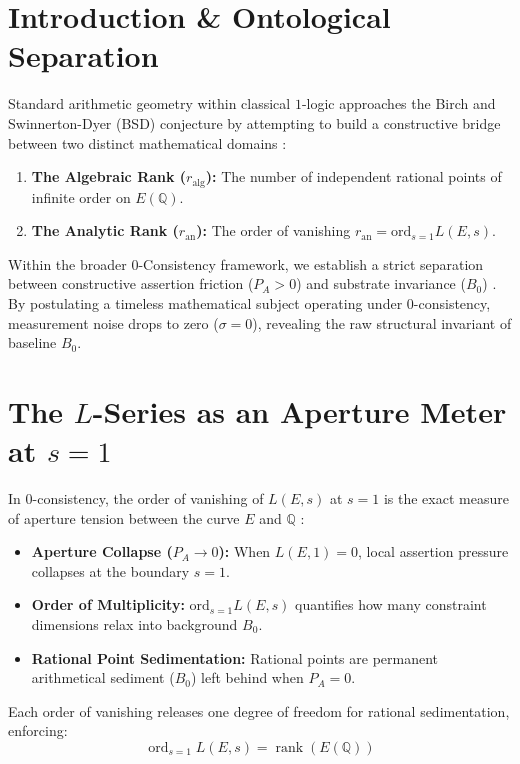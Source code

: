 \documentclass[11pt,a4paper]{article}
\begin{document}
\section{Introduction \& Ontological Separation}
Standard arithmetic geometry within classical $1$-logic approaches the Birch and Swinnerton-Dyer (BSD) conjecture \cite{birch_swinnerton_dyer_1965} by attempting to build a constructive bridge between two distinct mathematical domains \cite{nicht_theory_monograph}:
\begin{enumerate}
    \item \textbf{The Algebraic Rank ($r_{\text{alg}}$):} The number of independent rational points of infinite order on $E(\mathbb{Q})$.
    \item \textbf{The Analytic Rank ($r_{\text{an}}$):} The order of vanishing $r_{\text{an}} = \text{ord}_{s=1} L(E, s)$.
\end{enumerate}

Within the broader $0$-Consistency framework, we establish a strict separation between constructive assertion friction ($P_A > 0$) and substrate invariance ($B_0$) \cite{nicht_metaphysics_paper_0}. By postulating a timeless mathematical subject operating under $0$-consistency, measurement noise drops to zero ($\sigma = 0$), revealing the raw structural invariant of baseline $B_0$.

\section{The \texorpdfstring{$L$}{L}-Series as an Aperture Meter at \texorpdfstring{$s=1$}{s=1}}
In $0$-consistency, the order of vanishing of $L(E, s)$ at $s=1$ is the exact measure of aperture tension between the curve $E$ and $\mathbb{Q}$ \cite{nicht_theory_monograph}:

\begin{itemize}
    \item \textbf{Aperture Collapse ($P_A \to 0$):} When $L(E, 1) = 0$, local assertion pressure collapses at the boundary $s=1$.
    \item \textbf{Order of Multiplicity:} $\text{ord}_{s=1} L(E, s)$ quantifies how many constraint dimensions relax into background $B_0$.
    \item \textbf{Rational Point Sedimentation:} Rational points are permanent arithmetical sediment ($B_0$) left behind when $P_A = 0$.
\end{itemize}

Each order of vanishing releases one degree of freedom for rational sedimentation, enforcing:
\begin{equation}
\operatorname{ord}_{s=1} L(E, s) = \operatorname{rank}(E(\mathbb{Q}))
\end{equation}
\end{document}
